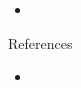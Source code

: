 \documentclass[final,t]{beamer}
\begin{document}
\begin{columns}[t]
\begin{column}{.25\linewidth}
\begin{block}{}
\begin{itemize}
	\item
\end{itemize}
\vspace{-0.2cm}
\end{block}

\begin{block}{References}

\begin{itemize}
\item
\end{itemize}
\vspace{-0.2cm}
\end{block}

\end{column}

\end{columns}
\end{document}
